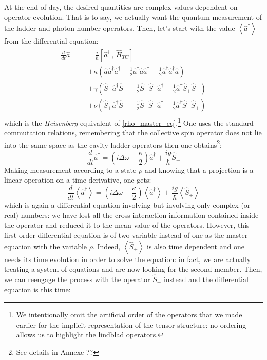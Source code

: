 \documentclass[10pt]{report}
\begin{document}
At the end of day, the desired quantities are complex values dependent on operator evolution. That is to say, we actually want the quantum measurement of the ladder and photon number operators. Then, let's start with the value $\left\langle\hat{a}^\dagger\right\rangle$ from the differential equation:
\begin{align}
\begin{split}
\frac{d}{dt}\hat{a}^\dagger = &\quad\frac{i}{\hbar}\left[ \hat{a}^\dagger \, , \,\hat{H}_{TC} \right]\\
&+ \kappa \left( \hat{a} \hat{a}^\dagger \hat{a}^\dagger - \frac{1}{2} \hat{a}^\dagger \hat{a} \hat{a}^\dagger - \frac{1}{2} \hat{a}^\dagger \hat{a}^\dagger \hat{a} \right)\\
&+ \gamma \left( \hat{S}_- \hat{a}^\dagger \hat{S}_+ - \frac{1}{2} \hat{S}_+ \hat{S}_- \hat{a}^\dagger - \frac{1}{2} \hat{a}^\dagger \hat{S}_+ \hat{S}_- \right)\\
&+ \nu \left( \hat{S}_+ \hat{a}^\dagger \hat{S}_- - \frac{1}{2} \hat{S}_- \hat{S}_+ \hat{a}^\dagger - \frac{1}{2} \hat{a}^\dagger \hat{S}_- \hat{S}_+ \right)
\end{split}
\end{align}
which is the \textit{Heisenberg} equivalent of \eqref{rho_master_eq}.\footnote{We intentionally omit the artificial order of the operators that we made earlier for the implicit representation of the tensor structure: no ordering allows us to highlight the lindblad operators.} One uses the standard commutation relations, remembering that the collective spin operator does not lie into the same space as the cavity ladder operators then one obtains\footnote{See details in Annexe ??}:
\begin{equation}
\label{ad_pure}
\frac{d}{dt}\hat{a}^\dagger = \left(i\Delta\omega - \frac{\kappa}{2} \right) \hat{a}^\dagger + \frac{ig}{\hbar} \hat{S}_+
\end{equation}
Making measurement according to a state $\rho$ and knowing that a projection is a linear operation on a time derivative, one gets:
\begin{equation}
\label{ad_mean_field}
\frac{d}{dt}\left\langle\hat{a}^\dagger\right\rangle = \left(i\Delta\omega - \frac{\kappa}{2} \right) \left\langle\hat{a}^\dagger\right\rangle + \frac{ig}{\hbar} \left\langle\hat{S}_+\right\rangle
\end{equation}
which is again a differential equation involving but involving only complex (or real) numbers: we have lost all the cross interaction information contained inside the operator and reduced it to the mean value of the operators. However, this first order differential equation is of two variable instead of one as the master equation with the variable $\rho$. Indeed, $\left\langle\hat{S}_+\right\rangle$ is also time dependent and one needs its time evolution in order to solve the equation: in fact, we are actually treating a system of equations and are now looking for the second member. Then, we can reengage the process with the operator $\hat{S}_+$ instead and the differential equation is this time:
\end{document}
